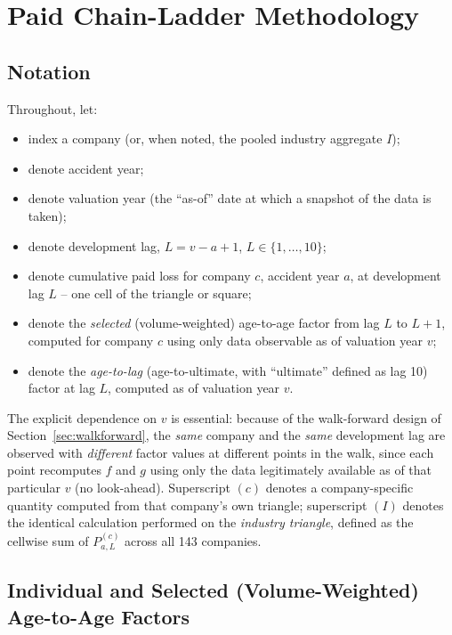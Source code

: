 \documentclass[11pt]{article}
\begin{document}
\section{Paid Chain-Ladder Methodology}
\label{sec:cl}

\subsection{Notation}

Throughout, let:
\begin{itemize}[leftmargin=2.2cm]
\item[$c$] index a company (or, when noted, the pooled industry aggregate $I$);
\item[$a$] denote accident year;
\item[$v$] denote valuation year (the ``as-of'' date at which a snapshot of the data is taken);
\item[$L$] denote development lag, $L = v - a + 1$, $L \in \{1, \dots, 10\}$;
\item[$P^{(c)}_{a,L}$] denote cumulative paid loss for company $c$, accident year $a$, at
  development lag $L$ -- one cell of the triangle or square;
\item[$f^{(c)}_{L}(v)$] denote the \emph{selected} (volume-weighted) age-to-age factor from lag
  $L$ to $L+1$, computed for company $c$ using only data observable as of valuation year $v$;
\item[$g^{(c)}_{L}(v)$] denote the \emph{age-to-lag} (age-to-ultimate, with ``ultimate'' defined
  as lag 10) factor at lag $L$, computed as of valuation year $v$.
\end{itemize}
The explicit dependence on $v$ is essential: because of the walk-forward design of
Section~\ref{sec:walkforward}, the \emph{same} company and the \emph{same} development lag are
observed with \emph{different} factor values at different points in the walk, since each point
recomputes $f$ and $g$ using only the data legitimately available as of that particular $v$ (no
look-ahead). Superscript $(c)$ denotes a company-specific quantity computed from that company's own
triangle; superscript $(I)$ denotes the identical calculation performed on the \emph{industry
triangle}, defined as the cellwise sum of $P^{(c)}_{a,L}$ across all 143 companies.

\subsection{Individual and Selected (Volume-Weighted) Age-to-Age Factors}
\end{document}
